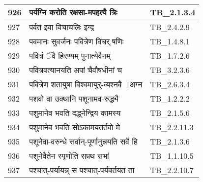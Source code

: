 \documentclass[17pt]{extarticle}
\begin{document}
\begin{longtable}{||p{0.4in}||p{4.9in}||p{0.9in}||}
    \hline
        
    926 & पर्यग्नि करोति रक्षसा{-}मपहत्यै त्रिः & TB\_2.1.3.4       \\
    
    \hline
        
    927 & पर्वत इवा विचाचलिः इन्द्र & TB\_2.4.2.9       \\
    
    \hline
        
    928 & पवमानः सुवर्जनः पवित्रेण विचर्.षणिः & TB\_1.4.8.1       \\
    
    \hline
        
    929 & पवित्रं ॅवै हिरण्यम् पुनात्येवैनम् & TB\_1.7.2.6       \\
    
    \hline
        
    930 & पवित्रवत्यानयति अपां चैवौषधीनां च & TB\_3.2.3.6       \\
    
    \hline
        
    931 & पवित्रेण शतायुषा विश्वमायुर्{-}व्यश्नवै ।अग्न & TB\_2.6.3.4       \\
    
    \hline
        
    932 & पशवो वा उक्थानि पशूनामव{-}रुद्ध्यै & TB\_1.2.2.2       \\
    
    \hline
        
    933 & पशुमानेव भवति दद्ध्नेन्द्रिय कामस्य & TB\_2.1.5.6       \\
    
    \hline
        
    934 & पशुमानेव भवति सोऽकामयतर्तवो मे & TB\_2.2.11.3       \\
    
    \hline
        
    935 & पशूनेवा{-}वरुन्धे सर्वान्{-}पूर्णानुन्नयति सर्वे हि & TB\_2.1.3.6       \\
    
    \hline
        
    936 & पशूनेवैतेन स्पृणोति सप्रथ सभां & TB\_1.1.10.5       \\
    
    \hline
        
    937 & पश्चात्{-}पर्यायन्न् स पश्चात्{-}पर्यवर्तयत ता & TB\_2.2.10.7       \\
    
    \hline
        

\end{longtable}
\end{document}
